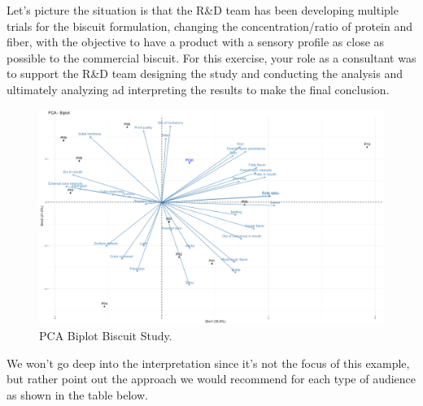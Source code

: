 \documentclass[
]{book}
\begin{document}
Let's picture the situation is that the R\&D team has been developing multiple trials for the biscuit formulation, changing the concentration/ratio of protein and fiber, with the objective to have a product with a sensory profile as close as possible to the commercial biscuit. For this exercise, your role as a consultant was to support the R\&D team designing the study and conducting the analysis and ultimately analyzing ad interpreting the results to make the final conclusion.

\begin{figure}

{\centering \includegraphics[width=0.85\linewidth]{images/PCA} 

}

\caption{PCA Biplot Biscuit Study.}\label{fig:pca}
\end{figure}

We won't go deep into the interpretation since it's not the focus of this example, but rather point out the approach we would recommend for each type of audience as shown in the table below.
\end{document}
